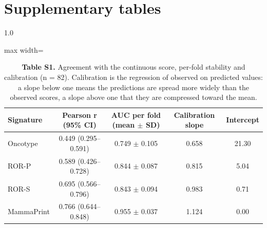 \documentclass[11pt,a4paper]{article}
\begin{document}
\section*{Supplementary tables}
\begin{spacing}{1.0}
\begin{table}[htbp]\centering\small
\caption*{\textbf{Table S1.} Agreement with the continuous score, per-fold stability and calibration (n = 82). Calibration is the regression of observed on predicted values: a slope below one means the predictions are spread more widely than the observed scores, a slope above one that they are compressed toward the mean.}
\begin{adjustbox}{max width=\textwidth}
\begin{tabular}{@{}lcccc@{}}
\toprule
\textbf{Signature} & \textbf{Pearson r (95\% CI)} & \textbf{AUC per fold (mean $\pm$ SD)} & \textbf{Calibration slope} & \textbf{Intercept} \\
\midrule
Oncotype & 0.449 (0.295--0.591) & 0.749 $\pm$ 0.105 & 0.658 & 21.30 \\
ROR-P & 0.589 (0.426--0.728) & 0.844 $\pm$ 0.087 & 0.815 & 5.04 \\
ROR-S & 0.695 (0.566--0.796) & 0.843 $\pm$ 0.094 & 0.983 & 0.71 \\
MammaPrint & 0.766 (0.644--0.848) & 0.955 $\pm$ 0.037 & 1.124 & 0.00 \\
\bottomrule
\end{tabular}
\end{adjustbox}\end{table}


\end{spacing}
\end{document}
